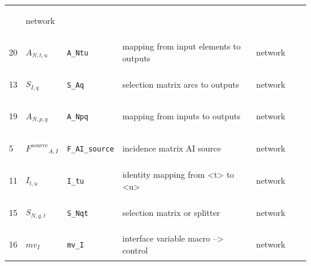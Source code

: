 \begin{longtable}{|p{1cm}|p{2.5cm}|p{4.5cm}|p{8cm}|p{3.0cm}|p{3cm}|p{1cm}|}
             & \begin{lay}network \end{lay}
             & $  $
             & \\
            20
             & \hypertarget{"v:20"}{ $ {{A}}{_{N, t, u}} $}
             & \verb|A_Ntu|
             & mapping from input elements to outputs
             & \begin{lay}network \end{lay}
             & $  $
             & \\
            13
             & \hypertarget{"v:13"}{ $ {{S}}{_{I, q}} $}
             & \verb|S_Aq|
             & selection matrix arcs to outputs
             & \begin{lay}network \end{lay}
             & $  $
             & \\
            19
             & \hypertarget{"v:19"}{ $ {{A}}{_{N, p, q}} $}
             & \verb|A_Npq|
             & mapping from inputs to outputs
             & \begin{lay}network \end{lay}
             & $  $
             & \\
            5
             & \hypertarget{"v:5"}{ $ {{F^{source}}}{_{A, I}} $}
             & \verb|F_AI_source|
             & incidence matrix AI source
             & \begin{lay}network \end{lay}
             & $  $
             & \\
            11
             & \hypertarget{"v:11"}{ $ {{I}}{_{t, u}} $}
             & \verb|I_tu|
             & identity mapping from <t> to <u>
             & \begin{lay}network \end{lay}
             & $  $
             & \\
            15
             & \hypertarget{"v:15"}{ $ {{S}}{_{N, q, t}} $}
             & \verb|S_Nqt|
             & selection matrix or splitter
             & \begin{lay}network \end{lay}
             & $  $
             & \\
            16
             & \hypertarget{"v:16"}{ $ {{mv}}{_{I}} $}
             & \verb|mv_I|
             & interface variable macro --> control
             & \begin{lay}network \end{lay}
             & $  $

\end{longtable}

